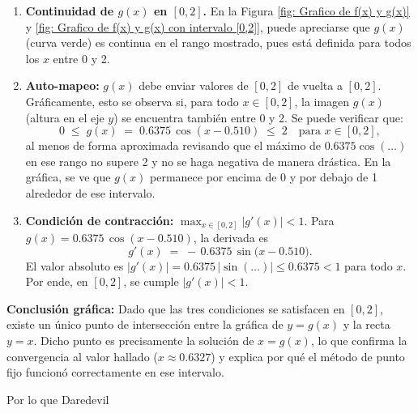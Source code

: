 \begin{enumerate}
  \item \textbf{Continuidad de \(g(x)\) en \([0,2]\).}
  En la Figura \ref{fig: Grafico de f(x) y g(x)} y \ref{fig: Grafico de f(x) y g(x) con intervalo [0,2]}, puede apreciarse que \(g(x)\) (curva verde) es continua en el rango mostrado, pues está definida para todos los \(x\) entre 0 y 2.

  \item \textbf{Auto-mapeo:} \(g(x)\) debe enviar valores de \([0,2]\) de vuelta a \([0,2]\).
  Gráficamente, esto se observa si, para todo \(x\in[0,2]\), la imagen \(g(x)\) (altura en el eje \(y\)) se encuentra también entre 0 y 2. Se puede verificar que:
  \[
    0 \;\le\; g(x) \;=\;0.6375 \,\cos(x-0.510) \;\le\;2
    \quad\text{para }x\in[0,2],
  \]
  al menos de forma aproximada revisando que el máximo de \(0.6375 \cos(\dots)\) en ese rango no supere 2 y no se haga negativa de manera drástica. En la gráfica, se ve que \(g(x)\) permanece por encima de 0 y por debajo de 1 alrededor de ese intervalo.

  \item \textbf{Condición de contracción:} \(\max_{x\in [0,2]} \lvert g'(x)\rvert < 1.\)
  Para \(g(x) = 0.6375\,\cos(x - 0.510)\), la derivada es
  \[
    g'(x) \;=\; -\,0.6375\,\sin\bigl(x - 0.510\bigr).
  \]
  El valor absoluto es \(\lvert g'(x)\rvert = 0.6375\,\lvert\sin(\dots)\rvert \le 0.6375 < 1\) para todo \(x\). Por ende, en \([0,2]\), se cumple \(\lvert g'(x)\rvert<1\).

\end{enumerate}

\noindent
\textbf{Conclusión gráfica:}  
Dado que las tres condiciones se satisfacen en \([0,2]\), existe un único punto de intersección entre la gráfica de \(y=g(x)\) y la recta \(y=x\). Dicho punto es precisamente la solución de \(x = g(x)\), lo que confirma la convergencia al valor hallado (\(x\approx 0.6327\)) y explica por qué el método de punto fijo funcionó correctamente en ese intervalo.


Por lo que Daredevil 